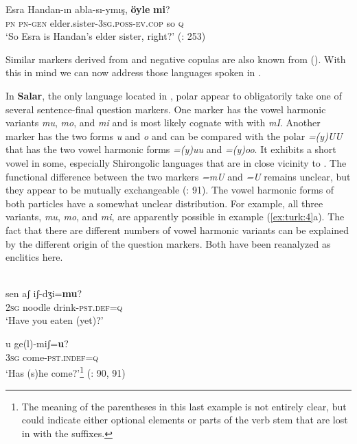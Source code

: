     \ex
    \gll Esra Handan-ın abla-sı-ymış, \textbf{{öyle}} \textbf{{mi}}?\\
    \textsc{pn}  \textsc{pn}-\textsc{gen}    elder.sister-3\textsc{sg}.\textsc{poss}-\textsc{ev}.\textsc{cop}  so  \textsc{q}\\
    \glt ‘So Esra is Handan’s elder sister, right?’ (\citealt{GökselKerslake2005}: 253)
    \z
    \z

\noindent Similar  markers derived from  and negative copulas are also known from  (). With this  in mind we can now address those  languages spoken in .

In \textbf{Salar}, the only  language located in , polar  appear to obligatorily take one of several sentence-final question markers. One marker has the vowel harmonic variants \textit{mu}, \textit{mo}, and \textit{mi} and is most likely cognate with with  \textit{mI}. Another marker has the two forms \textit{u} and \textit{o} and can be compared with the  polar  \textit{=(y)UU} that has the two vowel harmonic forms \textit{=(y)uu} and \textit{=(y)oo}. It exhibits a short vowel in some, especially Shirongolic languages that are in close vicinity to . The functional difference between the two markers \textit{=mU} and \textit{=U} remains unclear, but they appear to be mutually exchangeable (\citealt{LinLianyun1985}: 91). The vowel harmonic forms of both particles have a somewhat unclear distribution. For example, all three variants, \textit{mu}, \textit{mo}, and \textit{mi}, are apparently possible in example (\ref{ex:turk:4}a). The fact that there are different numbers of vowel harmonic variants can be explained by the different origin of the question markers. Both have been reanalyzed as enclitics here.

\ea%
    \label{ex:turk:4}
    \\
    \ea
    \gll sen  aʃ    iʃ-dʒi=\textbf{{mu}}?\\
    2\textsc{sg}  noodle    drink-\textsc{pst.def=q}\\
    \glt ‘Have you eaten (yet)?’
    
    \ex
    \gll u  ge(l)-miʃ=\textbf{{u}}?\\
    3\textsc{sg}  come-\textsc{pst.indef=q}\\
    \glt ‘Has (s)he come?’\footnote{The meaning of the parentheses in this last example is not entirely clear, but could indicate either optional elements or parts of the verb stem that are lost in  with the suffixes.} (\citealt{LinLianyun1985}: 90, 91)
    \z
    \z

